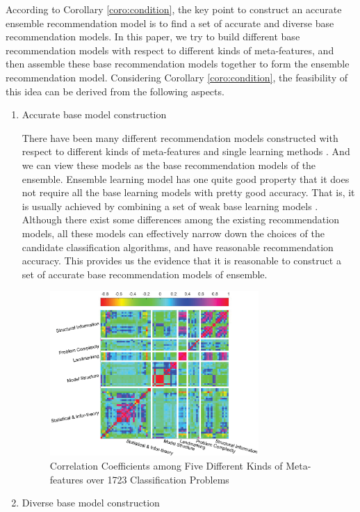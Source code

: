 \documentclass[prodmode,acmtkdd]{acmsmall}
\begin{document}
According to Corollary \ref{coro:condition}, the key point to
construct an accurate ensemble recommendation model is to find a set
of accurate and diverse base recommendation models. In this paper,
we try to build different base recommendation models with respect to
different kinds of meta-features, and then assemble these base
recommendation models together to form the ensemble recommendation
model. Considering Corollary \ref{coro:condition}, the feasibility
of this idea can be derived from the following aspects.
\begin{enumerate}
    \item Accurate base model construction

    \quad There have been many different recommendation models constructed
    with respect to different kinds of meta-features and single
    learning methods \cite{brazdil2003ranking,Bensusan1998god,peng2002improved,Pfahringer00meta,Bensusan2000casa,jain2000statistical,duin2004characterization,ho2002complexity,song2012automatic}. And we can view these
    models as the base recommendation models of the ensemble. Ensemble learning model has
    one quite good property that it does not require all the base learning models
    with pretty good accuracy. That is, it is usually achieved by combining a
    set of weak base learning models \cite{dietterichl2002ensemble}. Although there exist some differences among
    the existing recommendation models, all these models can effectively narrow down the choices of the
    candidate classification algorithms, and have reasonable
    recommendation accuracy. This provides us the evidence that it is reasonable to
    construct a set of accurate base recommendation models of ensemble.

\begin{figure}
    \centering
    \includegraphics[width=0.75\textwidth]{Figures/CorrelationBetweenMetaFeatures}
    \caption{Correlation Coefficients among Five Different Kinds of Meta-features over 1723 Classification Problems}\label{Fig:CorrelationAmongMetaFeatures}
\end{figure}
    \item Diverse base model construction


\end{enumerate}
\end{document}
